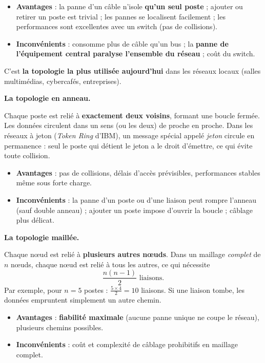 \documentclass[11pt]{article}
\newcommand{\cle}[1]{{\popxbold\color{popdark}#1}}
\begin{document}
\begin{itemize}
  \item \textbf{Avantages} : la panne d'un câble n'isole \textbf{qu'un seul poste} ; ajouter ou retirer un poste est trivial ; les pannes se localisent facilement ; les performances sont excellentes avec un switch (pas de collisions).
  \item \textbf{Inconvénients} : consomme plus de câble qu'un bus ; la \textbf{panne de l'équipement central paralyse l'ensemble du réseau} ; coût du switch.
\end{itemize}

C'est \textbf{la topologie la plus utilisée aujourd'hui} dans les réseaux locaux (salles multimédias, cybercafés, entreprises).

\textbf{La topologie en anneau.}\par
Chaque poste est relié à \textbf{exactement deux voisins}, formant une boucle fermée. Les données circulent dans un sens (ou les deux) de proche en proche. Dans les réseaux à \cle{jeton} (\emph{Token Ring} d'IBM), un message spécial appelé \emph{jeton} circule en permanence : seul le poste qui détient le jeton a le droit d'émettre, ce qui évite toute collision.

\begin{itemize}
  \item \textbf{Avantages} : pas de collisions, délais d'accès prévisibles, performances stables même sous forte charge.
  \item \textbf{Inconvénients} : la panne d'un poste ou d'une liaison peut rompre l'anneau (sauf double anneau) ; ajouter un poste impose d'ouvrir la boucle ; câblage plus délicat.
\end{itemize}

\textbf{La topologie maillée.}\par
Chaque nœud est relié à \textbf{plusieurs autres nœuds}. Dans un maillage \emph{complet} de $n$ nœuds, chaque nœud est relié à tous les autres, ce qui nécessite
\[ \frac{n(n-1)}{2} \text{ liaisons.} \]
Par exemple, pour $n = 5$ postes : $\frac{5 \times 4}{2} = 10$ liaisons. Si une liaison tombe, les données empruntent simplement un autre chemin.

\begin{itemize}
  \item \textbf{Avantages} : \textbf{fiabilité maximale} (aucune panne unique ne coupe le réseau), plusieurs chemins possibles.
  \item \textbf{Inconvénients} : coût et complexité de câblage prohibitifs en maillage complet.
\end{itemize}
\end{document}
